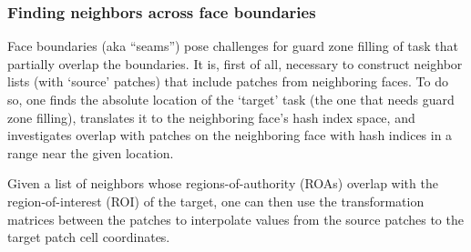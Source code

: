 \documentclass[paper=a4,fontsize=11pt]{scrartcl}
\numberwithin{equation}{section}		%
\numberwithin{figure}{section}			%
\numberwithin{table}{section}				%
\begin{document}
\subsubsection{Finding neighbors across face boundaries}
Face boundaries (aka ``seams'') pose challenges for guard zone filling of task that partially overlap the boundaries.  It is, first of all, necessary to construct neighbor lists (with `source' patches)  that include patches from neighboring faces.  To do so, one finds the absolute location of the `target' task (the one that needs guard zone filling), translates it to the neighboring face's hash index space, and investigates overlap with patches on the neighboring face with hash indices in a range near the given location.

Given a list of neighbors whose regions-of-authority (ROAs) overlap with the region-of-interest (ROI) of the target, one can then use the transformation matrices between the patches to interpolate values from the source patches to the target patch cell coordinates.

\end{document}
